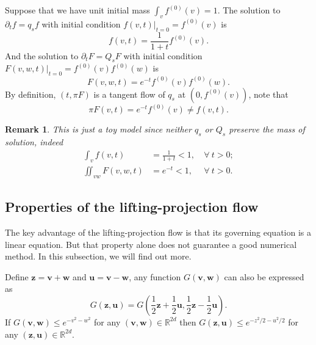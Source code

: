 \documentclass{article}
\newtheorem{remark}{Remark}
\numberwithin{equation}{section}
\begin{document}
Suppose that we have unit initial mass $\int_{v} f^{(0)}(v) = 1$. The solution to $\partial_{t}f = q_{s} f$ with initial condition $\left.f(v,t)\right|_{t=0} = f^{(0)}(v)$ is
\begin{equation*}
    f(v,t) = \frac{1}{1+t}f^{(0)}(v).
\end{equation*}
And the solution to $\partial_{t} F = Q_{s} F$ with initial condition $\left.F(v,w,t)\right|_{t=0} = f^{(0)}(v)f^{(0)}(w)$ is
\begin{equation*}
    F(v,w,t) = e^{-t}f^{(0)}(v)f^{(0)}(w).
\end{equation*}
By definition, $(t, \pi F)$ is a tangent flow of $q_{s}$ at $(0,f^{(0)}(v))$, note that
\begin{equation*}
    \pi F (v,t)= e^{-t} f^{(0)}(v) \neq f(v,t).
\end{equation*}

\begin{remark}
    This is just a toy model since neither $q_{s}$ or $Q_{s}$ preserve the mass of solution, indeed
    \begin{align*}
        \int_{v} f(v,t) &= \frac{1}{1+t} <1, &\ \forall \  t>0;\\
            \iint_{vw} F(v,w,t) &= e^{-t}<1,&\ \forall \  t>0.
    \end{align*}
    
\end{remark}

\subsection{Properties of the lifting-projection flow} \label{subsec:properties}

The key advantage of the lifting-projection flow is that its governing equation is a linear equation. But that property alone does not guarantee a good numerical method. In this subsection, we will find out more.

Define $\mathbf{z} = \mathbf{v}+\mathbf{w}$ and $\mathbf{u} = \mathbf{v}-\mathbf{w}$, any function $G(\mathbf{v},\mathbf{w})$ can also be expressed as
\begin{equation*}
    G(\mathbf{z},\mathbf{u}) = G(\frac{1}{2}\mathbf{z}+\frac{1}{2}\mathbf{u},\frac{1}{2}\mathbf{z}-\frac{1}{2}\mathbf{u}).
\end{equation*}
If $G(\mathbf{v},\mathbf{w}) \leq e^{-v^{2}-w^{2}}$ for any $(\mathbf{v},\mathbf{w}) \in \mathbb{R}^{2d}$ then $G(\mathbf{z},\mathbf{u}) \leq e^{-z^{2}/2-u^{2}/2}$ for any $(\mathbf{z},\mathbf{u}) \in \mathbb{R}^{2d}$.
\end{document}
